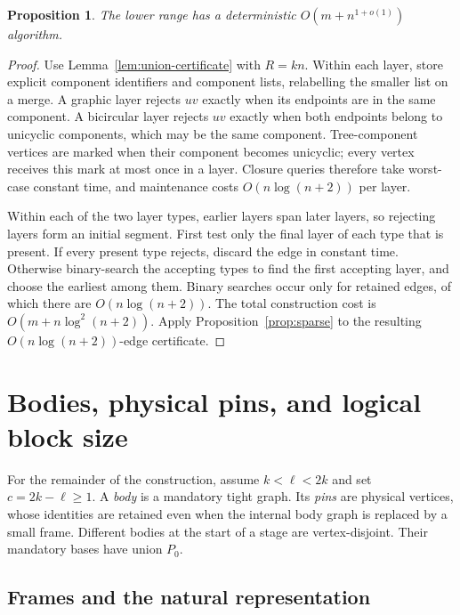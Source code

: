 \documentclass[11pt,a4paper]{article}
\newtheorem{proposition}[theorem]{Proposition}
\theoremstyle{definition}
\theoremstyle{remark}
\begin{document}
\begin{proposition}\label{prop:lower}
The lower range has a deterministic
$O(m+n^{1+o(1)})$ algorithm.
\end{proposition}
\begin{proof}
Use Lemma~\ref{lem:union-certificate} with $R=kn$.
Within each layer, store explicit component identifiers
and component lists, relabelling the smaller list on a merge.
A graphic layer rejects $uv$ exactly when its endpoints
are in the same component. A bicircular layer rejects
$uv$ exactly when both endpoints belong to unicyclic
components, which may be the same component.
Tree-component vertices are marked when their component
becomes unicyclic; every vertex receives this mark at most
once in a layer.
Closure queries therefore take worst-case constant time,
and maintenance costs $O(n\log(n+2))$ per layer.

Within each of the two layer types, earlier layers span
later layers, so rejecting layers form an initial segment.
First test only the final layer of each type that is present.
If every present type rejects, discard the edge in constant time.
Otherwise binary-search the accepting types to find the
first accepting layer, and choose the earliest among them.
Binary searches occur only for retained edges, of which
there are $O(n\log(n+2))$.
The total construction cost is
$O(m+n\log^2(n+2))$.
Apply Proposition~\ref{prop:sparse} to the resulting
$O(n\log(n+2))$-edge certificate.
\end{proof}

\section{Bodies, physical pins, and logical block size}
\label{sec:bodies}

For the remainder of the construction, assume
$k<\ell<2k$ and set $c=2k-\ell\geq1$.
A \emph{body} is a mandatory tight graph. Its \emph{pins}
are physical vertices, whose identities are retained even
when the internal body graph is replaced by a small frame.
Different bodies at the start of a stage are vertex-disjoint.
Their mandatory bases have union $P_0$.

\subsection{Frames and the natural representation}
\end{document}
